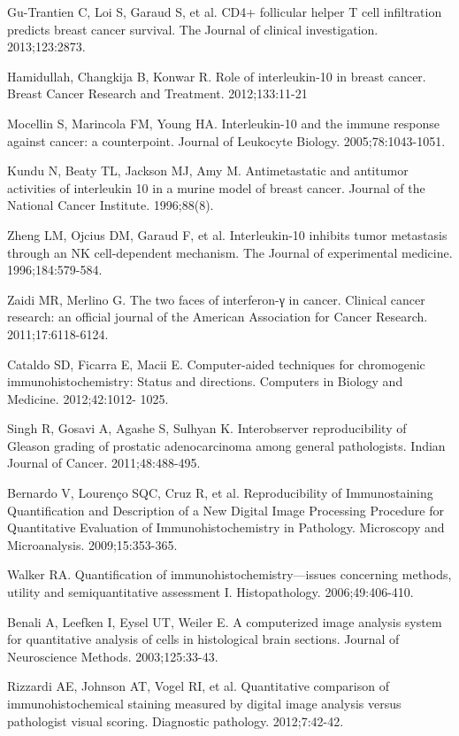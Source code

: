 \documentclass[12pt]{article}
\begin{document}
\noindent[12] Gu-Trantien C, Loi S, Garaud S, et al. CD4+ follicular helper T cell infiltration predicts breast
cancer survival. The Journal of clinical investigation. 2013;123:2873.

\noindent[13] Hamidullah, Changkija B, Konwar R. Role of interleukin-10 in breast cancer. Breast Cancer
Research and Treatment. 2012;133:11-21

\noindent[14] Mocellin S, Marincola FM, Young HA. Interleukin-10 and the immune response against cancer: a
counterpoint. Journal of Leukocyte Biology. 2005;78:1043-1051.

\noindent[15] Kundu N, Beaty TL, Jackson MJ, Amy M. Antimetastatic and antitumor activities of interleukin
10 in a murine model of breast cancer. Journal of the National Cancer Institute. 1996;88(8).

\noindent[16] Zheng LM, Ojcius DM, Garaud F, et al. Interleukin-10 inhibits tumor metastasis through an NK
cell-dependent mechanism. The Journal of experimental medicine. 1996;184:579-584.

\noindent[17] Zaidi MR, Merlino G. The two faces of interferon-γ in cancer. Clinical cancer research: an
official journal of the American Association for Cancer Research. 2011;17:6118-6124.

\noindent[18] Cataldo SD, Ficarra E, Macii E. Computer-aided techniques for chromogenic
immunohistochemistry: Status and directions. Computers in Biology and Medicine. 2012;42:1012-
1025.

\noindent[19] Singh R, Gosavi A, Agashe S, Sulhyan K. Interobserver reproducibility of Gleason grading of
prostatic adenocarcinoma among general pathologists. Indian Journal of Cancer. 2011;48:488-495.

\noindent[20] Bernardo V, Lourenço SQC, Cruz R, et al. Reproducibility of Immunostaining Quantification and
Description of a New Digital Image Processing Procedure for Quantitative Evaluation of
Immunohistochemistry in Pathology. Microscopy and Microanalysis. 2009;15:353-365.

\noindent[21] Walker RA. Quantification of immunohistochemistry---issues concerning methods, utility and
semiquantitative assessment I. Histopathology. 2006;49:406-410.

\noindent[22] Benali A, Leefken I, Eysel UT, Weiler E. A computerized image analysis system for quantitative
analysis of cells in histological brain sections. Journal of Neuroscience Methods. 2003;125:33-43.

\noindent[23] Rizzardi AE, Johnson AT, Vogel RI, et al. Quantitative comparison of immunohistochemical
staining measured by digital image analysis versus pathologist visual scoring. Diagnostic pathology.
2012;7:42-42.
\end{document}
